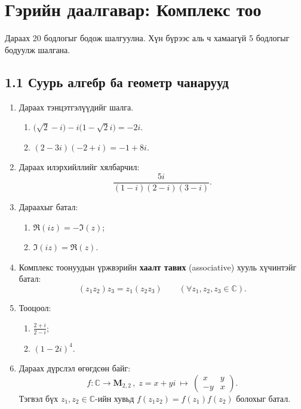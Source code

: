 \chapter*{Гэрийн даалгавар: Комплекс тоо}
Дараах 20 бодлогыг бодож шалгуулна. Хүн бүрээс аль ч хамаагүй 5 бодлогыг бодуулж шалгана.
\section*{1.1 Суурь алгебр ба геометр чанарууд}
\begin{enumerate}[label=\textbf{1.\arabic*}, itemsep=8pt]

\item Дараах тэнцэтгэлүүдийг шалга.
\begin{enumerate}[label=\textbf{(\alph*)}]
\item $\big(\sqrt{2}-i\big)-i\big(1-\sqrt{2}i\big)=-2i$.
\item $(2-3i)(-2+i)=-1+8i$.
\end{enumerate}

\item Дараах илэрхийллийг хялбарчил:
\[
\frac{5i}{(1-i)(2-i)(3-i)}.
\]

\item Дараахыг батал:
\begin{enumerate}[label=\textbf{(\alph*)}]
\item $\Re(iz)=-\Im(z)$;
\item $\Im(iz)=\Re(z)$.
\end{enumerate}

\item Комплекс тоонуудын үржвэрийн \textbf{хаалт тавих} (associative) хууль хүчинтэйг батал:
\[
(z_1z_2)z_3=z_1(z_2z_3)\qquad(\forall z_1,z_2,z_3\in\mathbb C).
\]

\item Тооцоол:
\begin{enumerate}[label=\textbf{(\alph*)}]
\item $\displaystyle \frac{2+i}{2-i}$;
\item $(1-2i)^4$.
\end{enumerate}

\item Дараах дүрслэл өгөгдсөн байг:
\[
f:\mathbb{C}\to \mathbf{M}_{2,2} \,
, \; z=x+yi\ \mapsto\
\begin{pmatrix}
x & y\\
-y & x
\end{pmatrix}.
\]
Тэгвэл бүх $z_1,z_2\in\mathbb C$-ийн хувьд $f(z_1z_2)=f(z_1)f(z_2)$ болохыг батал.


\end{enumerate}
